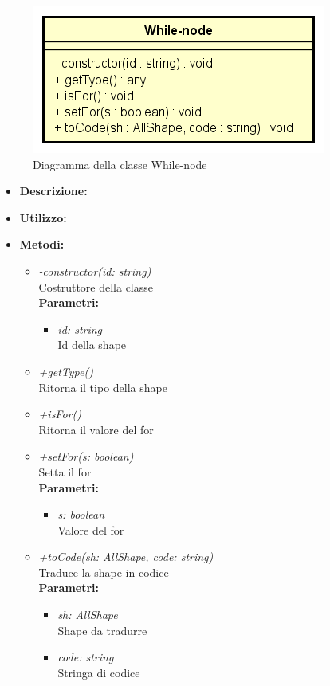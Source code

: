 \begin{figure}[h!]
	\centering
	\includegraphics[scale=0.8]{res/sections/SpecificaFrontEnd/Services/Disegnetti/while-node.png}
	\caption{Diagramma della classe While-node}
\end{figure}

\begin{itemize}
	\item \textbf{Descrizione:}\\
	
	\item \textbf{Utilizzo:}\\
	
	\item \textbf{Metodi:}
		\begin{itemize}
			\item \emph{-constructor(id: string)}\\
    		Costruttore della classe\\
    		\textbf{Parametri:}
    		\begin{itemize}
    			\item \emph{id: string}\\
    			Id della shape
    		\end{itemize}
    		\item \emph{+getType()}\\
    		Ritorna il tipo della shape
    		\item \emph{+isFor()}\\
    		Ritorna il valore del for
    		\item \emph{+setFor(s: boolean)}\\
    		Setta il for\\
    		\textbf{Parametri:}
    		\begin{itemize}
    			\item \emph{s: boolean}\\
    			Valore del for
    		\end{itemize}
    		\item \emph{+toCode(sh: AllShape, code: string)}\\
    		Traduce la shape in codice\\
    		\textbf{Parametri:}
    		\begin{itemize}
    			\item \emph{sh: AllShape}\\
    			Shape da tradurre
    			\item \emph{code: string}\\
    			Stringa di codice
    		\end{itemize}
    	\end{itemize}
\end{itemize}